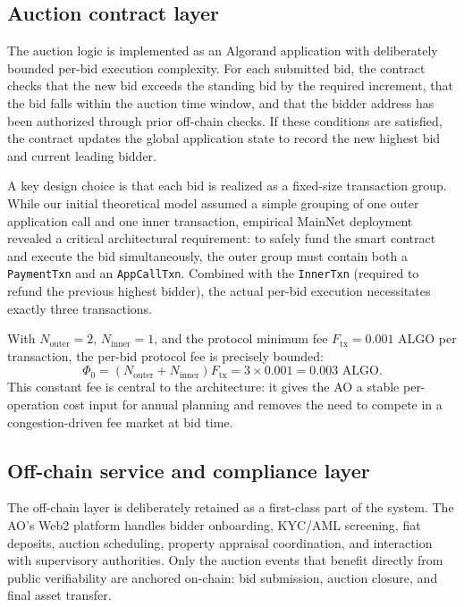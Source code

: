 \documentclass[runningheads]{llncs}
\begin{document}
\subsection{Auction contract layer}

The auction logic is implemented as an Algorand application with deliberately
bounded per-bid execution complexity. For each submitted bid, the contract
checks that the new bid exceeds the standing bid by the required increment, that
the bid falls within the auction time window, and that the bidder address has
been authorized through prior off-chain checks. If these conditions are satisfied,
the contract updates the global application state to record the new highest bid
and current leading bidder.

A key design choice is that each bid is realized as a fixed-size transaction group. While our initial theoretical model assumed a simple grouping of one outer application call and one inner transaction, empirical MainNet deployment revealed a critical architectural requirement: to safely fund the smart contract and execute the bid simultaneously, the outer group must contain both a \texttt{PaymentTxn} and an \texttt{AppCallTxn}. Combined with the \texttt{InnerTxn} (required to refund the previous highest bidder), the actual per-bid execution necessitates exactly three transactions.

With $N_{\text{outer}} = 2$, $N_{\text{inner}} = 1$, and the protocol minimum fee $F_{\text{tx}} = 0.001$ ALGO per transaction, the per-bid protocol fee is precisely bounded:
\begin{equation}
\Phi_0 = (N_{\text{outer}} + N_{\text{inner}})F_{\text{tx}} = 3 \times 0.001 = 0.003 \text{ ALGO}.
\end{equation}
This constant fee is central to the architecture: it gives the AO a stable
per-operation cost input for annual planning and removes the need to compete in
a congestion-driven fee market at bid time.

\subsection{Off-chain service and compliance layer}

The off-chain layer is deliberately retained as a first-class part of the system.
The AO's Web2 platform handles bidder onboarding, KYC/AML screening, fiat
deposits, auction scheduling, property appraisal coordination, and interaction
with supervisory authorities. Only the auction events that benefit directly from
public verifiability are anchored on-chain: bid submission, auction closure, and
final asset transfer.
\end{document}
